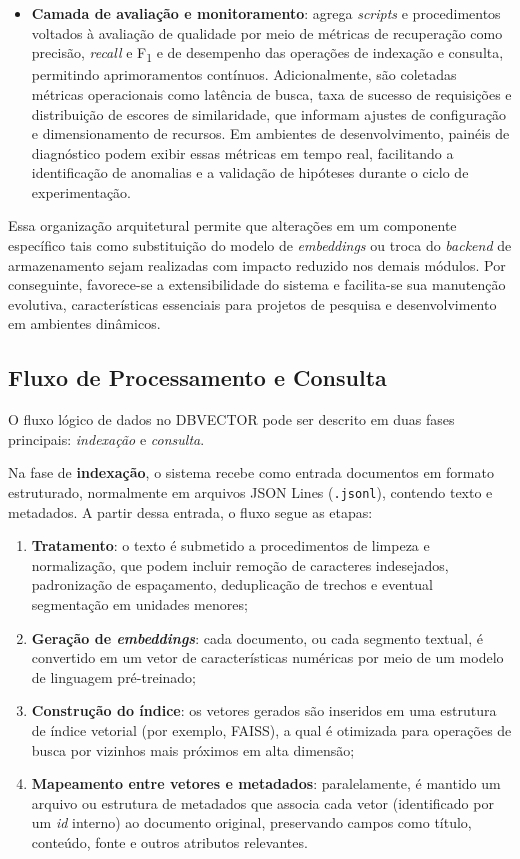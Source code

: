 \begin{itemize}
  \item \textbf{Camada de avaliação e monitoramento}: agrega \textit{scripts} e procedimentos voltados à avaliação de qualidade por meio de métricas de recuperação como precisão, \textit{recall} e F\textsubscript{1} e de desempenho das operações de indexação e consulta, permitindo aprimoramentos contínuos. Adicionalmente, são coletadas métricas operacionais como latência de busca, taxa de sucesso de requisições e distribuição de escores de similaridade, que informam ajustes de configuração e dimensionamento de recursos. Em ambientes de desenvolvimento, painéis de diagnóstico podem exibir essas métricas em tempo real, facilitando a identificação de anomalias e a validação de hipóteses durante o ciclo de experimentação.
\end{itemize}

Essa organização arquitetural permite que alterações em um componente específico tais como substituição do modelo de \textit{embeddings} ou troca do \textit{backend} de armazenamento sejam realizadas com impacto reduzido nos demais módulos. Por conseguinte, favorece-se a extensibilidade do sistema e facilita-se sua manutenção evolutiva, características essenciais para projetos de pesquisa e desenvolvimento em ambientes dinâmicos.

\subsection{Fluxo de Processamento e Consulta}
O fluxo lógico de dados no DBVECTOR pode ser descrito em duas fases principais: \textit{indexação} e \textit{consulta}.

Na fase de \textbf{indexação}, o sistema recebe como entrada documentos em formato estruturado, normalmente em arquivos JSON Lines (\texttt{.jsonl}), contendo texto e metadados. A partir dessa entrada, o fluxo segue as etapas:

\begin{enumerate}
  \item \textbf{Tratamento}: o texto é submetido a procedimentos de limpeza e normalização, que podem incluir remoção de caracteres indesejados, padronização de espaçamento, deduplicação de trechos e eventual segmentação em unidades menores;
  \item \textbf{Geração de \textit{embeddings}}: cada documento, ou cada segmento textual, é convertido em um vetor de características numéricas por meio de um modelo de linguagem pré-treinado;
  \item \textbf{Construção do índice}: os vetores gerados são inseridos em uma estrutura de índice vetorial (por exemplo, FAISS), a qual é otimizada para operações de busca por vizinhos mais próximos em alta dimensão;
  \item \textbf{Mapeamento entre vetores e metadados}: paralelamente, é mantido um arquivo ou estrutura de metadados que associa cada vetor (identificado por um \textit{id} interno) ao documento original, preservando campos como título, conteúdo, fonte e outros atributos relevantes.
\end{enumerate}

